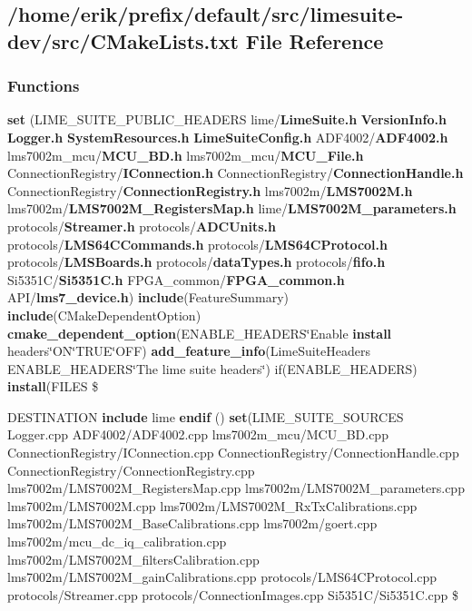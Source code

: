 \subsection{/home/erik/prefix/default/src/limesuite-\/dev/src/\+C\+Make\+Lists.txt File Reference}
\label{limesuite-dev_2src_2CMakeLists_8txt}
\subsubsection*{Functions}
\begin{DoxyCompactItemize}
\item 
{\bf set} (L\+I\+M\+E\+\_\+\+S\+U\+I\+T\+E\+\_\+\+P\+U\+B\+L\+I\+C\+\_\+\+H\+E\+A\+D\+E\+RS lime/{\bf Lime\+Suite.\+h} {\bf Version\+Info.\+h} {\bf Logger.\+h} {\bf System\+Resources.\+h} {\bf Lime\+Suite\+Config.\+h} A\+D\+F4002/{\bf A\+D\+F4002.\+h} lms7002m\+\_\+mcu/{\bf M\+C\+U\+\_\+\+B\+D.\+h} lms7002m\+\_\+mcu/{\bf M\+C\+U\+\_\+\+File.\+h} Connection\+Registry/{\bf I\+Connection.\+h} Connection\+Registry/{\bf Connection\+Handle.\+h} Connection\+Registry/{\bf Connection\+Registry.\+h} lms7002m/{\bf L\+M\+S7002\+M.\+h} lms7002m/{\bf L\+M\+S7002\+M\+\_\+\+Registers\+Map.\+h} lime/{\bf L\+M\+S7002\+M\+\_\+parameters.\+h} protocols/{\bf Streamer.\+h} protocols/{\bf A\+D\+C\+Units.\+h} protocols/{\bf L\+M\+S64\+C\+Commands.\+h} protocols/{\bf L\+M\+S64\+C\+Protocol.\+h} protocols/{\bf L\+M\+S\+Boards.\+h} protocols/{\bf data\+Types.\+h} protocols/{\bf fifo.\+h} Si5351C/{\bf Si5351\+C.\+h} F\+P\+G\+A\+\_\+common/{\bf F\+P\+G\+A\+\_\+common.\+h} A\+PI/{\bf lms7\+\_\+device.\+h}) {\bf include}(Feature\+Summary) {\bf include}(C\+Make\+Dependent\+Option) {\bf cmake\+\_\+dependent\+\_\+option}(E\+N\+A\+B\+L\+E\+\_\+\+H\+E\+A\+D\+E\+RS\char`\"{}Enable {\bf install} headers\char`\"{}ON\char`\"{}T\+R\+UE\char`\"{}O\+FF) {\bf add\+\_\+feature\+\_\+info}(Lime\+Suite\+Headers E\+N\+A\+B\+L\+E\+\_\+\+H\+E\+A\+D\+E\+RS\char`\"{}The lime suite headers\char`\"{}) if(E\+N\+A\+B\+L\+E\+\_\+\+H\+E\+A\+D\+E\+RS) {\bf install}(F\+I\+L\+ES \$
\item 
D\+E\+S\+T\+I\+N\+A\+T\+I\+ON {\bf include} lime {\bf endif} () {\bf set}(L\+I\+M\+E\+\_\+\+S\+U\+I\+T\+E\+\_\+\+S\+O\+U\+R\+C\+ES Logger.\+cpp A\+D\+F4002/A\+D\+F4002.\+cpp lms7002m\+\_\+mcu/M\+C\+U\+\_\+\+B\+D.\+cpp Connection\+Registry/I\+Connection.\+cpp Connection\+Registry/Connection\+Handle.\+cpp Connection\+Registry/Connection\+Registry.\+cpp lms7002m/L\+M\+S7002\+M\+\_\+\+Registers\+Map.\+cpp lms7002m/L\+M\+S7002\+M\+\_\+parameters.\+cpp lms7002m/L\+M\+S7002\+M.\+cpp lms7002m/L\+M\+S7002\+M\+\_\+\+Rx\+Tx\+Calibrations.\+cpp lms7002m/L\+M\+S7002\+M\+\_\+\+Base\+Calibrations.\+cpp lms7002m/goert.\+cpp lms7002m/mcu\+\_\+dc\+\_\+iq\+\_\+calibration.\+cpp lms7002m/L\+M\+S7002\+M\+\_\+filters\+Calibration.\+cpp lms7002m/L\+M\+S7002\+M\+\_\+gain\+Calibrations.\+cpp protocols/L\+M\+S64\+C\+Protocol.\+cpp protocols/Streamer.\+cpp protocols/Connection\+Images.\+cpp Si5351C/Si5351\+C.\+cpp \$

\end{DoxyCompactItemize}
